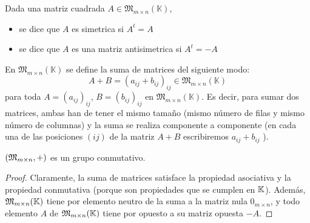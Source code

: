 \begin{definition}
	Dada una matriz cuadrada \(A \in \mathfrak{M}_{m \times n}(\mathbb{K}) \),
	\begin{itemize}
		\item se dice que \(A \) es simetrica si \(A^{t} = A \)
		\item se dice que \(A \) es una matriz antisimetrica si \(A^{t} = -A \)
	\end{itemize}
\end{definition}

\begin{definition}
	En \(\mathfrak{M}_{m \times n}(\mathbb{K}) \) se define la suma de matrices del siguiente modo:
	\[
		A + B = (a_{ij} + b_{ij})_{ij} \in \mathfrak{M}_{m \times n}(\mathbb{K})
	\]
	para toda \(A = (a_{ij})_{ij}\), \(B = (b_{ij})_{ij}\) en \(\mathfrak{M}_{m \times n}(\mathbb{K}) \). Es decir, para sumar dos matrices, ambas han de tener el mismo tamaño (mismo número de filas y mismo número de columnas) y la suma se realiza componente a componente (en cada una de las posiciones \((ij )\) de la matriz \(A + B \) escribiremos \(a_{ij} + b_{ij}\) ).
\end{definition}

\begin{proposition}
	\((\mathfrak{\MakeUppercase{m}}_{m\times n}, + )\) es un grupo conmutativo.
\end{proposition}
\begin{proof}
	Claramente, la suma de matrices satisface la propiedad asociativa y la propiedad conmutativa (porque son propiedades que se cumplen en \(\mathbb{K} \)). Además, \(\mathfrak{\MakeUppercase{m}}_{m \times n}(\K )\) tiene por elemento neutro de la suma a la matriz nula \(0_{m \times n }\), y todo elemento \(A \) de \(\mathfrak{\MakeUppercase{m}}_{m \times n }(\K)\) tiene por opuesto a su matriz opuesta \(-A \).
\end{proof}

